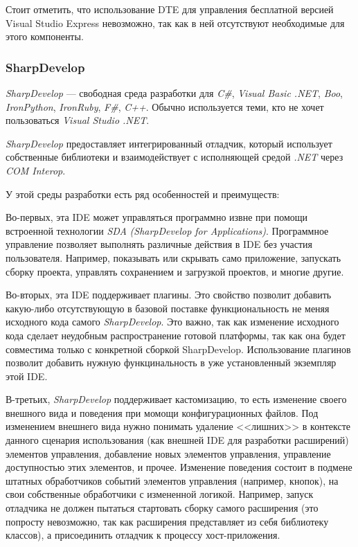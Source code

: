 Стоит отметить, что использование DTE для управления бесплатной версией Visual Studio Express невозможно, так как в ней отсутствуют необходимые для этого компоненты.

\subsubsection{SharpDevelop}

{\it SharpDevelop} --- свободная среда разработки для {\it C\#}, {\it Visual Basic .NET}, {\it Boo}, {\it IronPython}, {\it IronRuby}, {\it F\#}, {\it C++}. Обычно используется теми, кто не хочет пользоваться {\it Visual Studio .NET}.

{\it SharpDevelop} предоставляет интегрированный отладчик, который использует собственные библиотеки и взаимодействует с исполняющей средой {\it .NET} через {\it COM Interop}.

У этой среды разработки есть ряд особенностей и преимуществ:

Во-первых, эта IDE может управляться программно извне при помощи встроенной технологии {\it SDA} {\it (SharpDevelop for Applications)}. Программное управление позволяет выполнять различные действия в IDE без участия пользователя. Например, показывать или скрывать само приложение, запускать сборку проекта, управлять сохранением и загрузкой проектов, и многие другие. 

Во-вторых, эта IDE поддерживает плагины. Это свойство позволит добавить какую-либо отсутствующую в базовой поставке функциональность не меняя исходного кода самого {\it SharpDevelop}. Это важно, так как изменение исходного кода сделает неудобным распространение готовой платформы, так как она будет совместима только с конкретной сборкой SharpDevelop. Использование плагинов позволит добавить нужную функцинальность в уже установленный экземпляр этой IDE.

В-третьих, {\it SharpDevelop} поддерживает кастомизацию, то есть изменение своего внешного вида и поведения при момощи конфигурационных файлов. Под изменением внешнего вида нужно понимать удаление <<лишних>> в контексте данного сценария использования (как внешней IDE для разработки расширений) элементов управления, добавление новых элементов управления, управление доступностью этих элементов, и прочее. Изменение поведения состоит в подмене штатных обработчиков событий элементов управления (например, кнопок), на свои собственные обработчики с измененной логикой. Например, запуск отладчика не должен пытаться стартовать сборку самого расширения (это попросту невозможно, так как расширения представляет из себя библиотеку классов), а присоединить отладчик к процессу хост-приложения.

